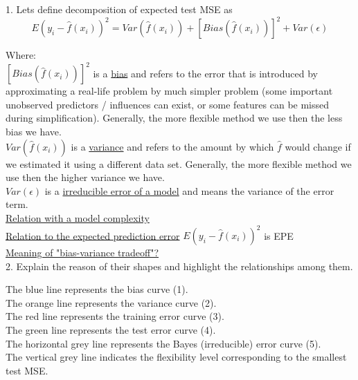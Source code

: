 \documentclass[a4paper,12pt,titlepage]{article} %
\begin{document}
1. Lets define decomposition of expected test MSE  as $$ E (y_{i} - \hat{f}(x_{i}))^{2} = Var(\hat{f}(x_{i})) + [Bias(\hat{f}(x_{i}))]^{2} + Var(\epsilon) $$

Where: \\
$ [Bias(\hat{f}(x_{i}))]^{2} $ is a \underline{bias} and refers to the error that is introduced by approximating a real-life problem by much simpler problem (some important unobserved predictors / influences can exist, or some features can be missed during simplification). Generally, the more flexible method we use then the less bias we have.\\

$ Var(\hat{f}(x_{i})) $ is a \underline{variance} and refers to the amount by which $ \hat{f} $ would change if we estimated it using a different data set. Generally, the more flexible method we use then the higher variance we have.\\

$ Var(\epsilon) $  is a \underline{irreducible error of a model} and means the variance of the error term. \\

\underline{Relation with a model complexity} \\

\underline{Relation to the expected prediction error} $ E (y_{i} - \hat{f}(x_{i}))^{2} $ is EPE \\

\underline{Meaning of "bias-variance tradeoff"?}\\

2. Explain the reason of their shapes and highlight the relationships among them.

The blue line represents the bias curve (1).\\
The orange line represents the variance curve (2).\\
The red line represents the training error curve (3).\\
The green line represents the test error curve (4).\\
The horizontal grey line represents the Bayes (irreducible) error curve (5).\\
The vertical grey line indicates the flexibility level corresponding to the smallest test MSE.	\\
		
\end{document}
